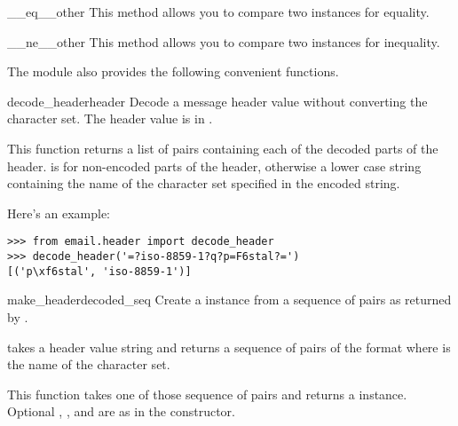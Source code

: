 \begin{methoddesc}[Header]{__eq__}{other}
This method allows you to compare two  instances for equality.
\end{methoddesc}

\begin{methoddesc}[Header]{__ne__}{other}
This method allows you to compare two  instances for inequality.
\end{methoddesc}

The  module also provides the following
convenient functions.

\begin{funcdesc}{decode_header}{header}
Decode a message header value without converting the character set.
The header value is in .

This function returns a list of  pairs
containing each of the decoded parts of the header.   is
 for non-encoded parts of the header, otherwise a lower
case string containing the name of the character set specified in the
encoded string.

Here's an example:

\begin{verbatim}
>>> from email.header import decode_header
>>> decode_header('=?iso-8859-1?q?p=F6stal?=')
[('p\xf6stal', 'iso-8859-1')]
\end{verbatim}
\end{funcdesc}

\begin{funcdesc}{make_header}{decoded_seq}
Create a  instance from a sequence of pairs as returned
by .

 takes a header value string and returns a
sequence of pairs of the format  where
 is the name of the character set.

This function takes one of those sequence of pairs and returns a
 instance.  Optional ,
, and  are as in the
 constructor.
\end{funcdesc}
